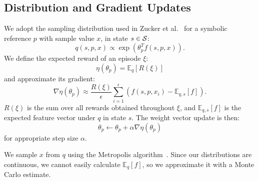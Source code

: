 \subsection{Distribution and Gradient Updates}
We adopt the sampling distribution used in Zucker et al.~\cite{workspacebias}
for a symbolic reference $p$ with sample value $x$, in state $s \in \mathcal{S}$:
$$q(s, p, x) \propto \exp(\theta_{p}^{T} f(s, p, x)).$$
We define the expected reward of an episode $\xi$:
$$\eta(\theta_{p}) = \mathbb{E}_{q}[R(\xi)]$$ and approximate its gradient:
$$\nabla \eta(\theta_{p}) \approx \frac{R(\xi)}{\epsilon} \sum_{i=1}^{\epsilon}(f(s, p, x_{i}) - \mathbb{E}_{q,s}[f]).$$
$R(\xi)$ is the sum over all rewards obtained throughout $\xi$, and
$\mathbb{E}_{q,s}[f]$ is the expected feature vector under $q$ in state $s$. The weight vector update is then:
$$\theta_{p} \leftarrow \theta_{p} + \alpha \nabla \eta(\theta_{p})$$
for appropriate step size $\alpha$.

We sample $x$ from $q$ using the Metropolis algorithm~\cite{chib1995understanding}.
Since our distributions are continuous, we cannot easily calculate $\mathbb{E}_{q}[f]$,
so we approximate it with a Monte Carlo estimate.